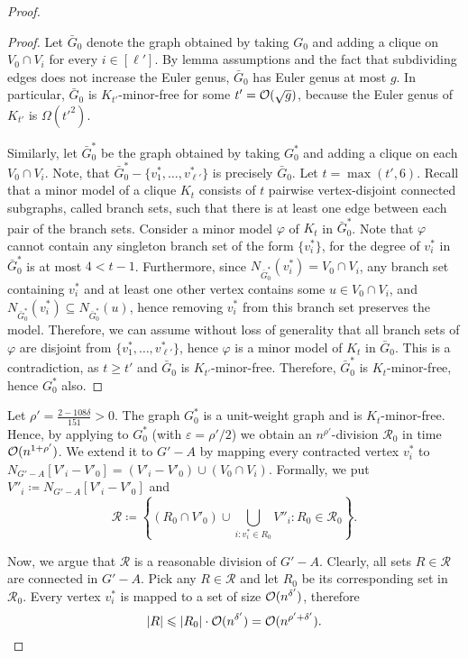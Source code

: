 \begin{proof}
\begin{proof}
Let $\bar{G}_0$ denote the graph obtained by taking $G_0$ and adding a clique on $V_0 \cap V_i$ for every $i \in [\ell']$.
By lemma assumptions and the fact that subdividing edges does not increase the Euler genus, $\bar{G}_0$ has Euler genus at most $g$. In particular, $\bar{G}_0$ is $K_{t'}$-minor-free for some $t' = \mathcal{O}(\sqrt{g})$, because the Euler genus of $K_{t'}$ is $\Omega({t'}^2)$.

Similarly, let $\bar{G}_0^*$ be the graph obtained by taking $G_0^*$ and adding a clique on each $V_0 \cap V_i$.
Note, that $\bar{G}_0^* - \{v_1^*, \dots, v_{\ell'}^*\}$ is precisely $\bar{G}_0$. Let $t = \max(t', 6)$.
Recall that a minor model of a clique $K_t$ consists of $t$ pairwise vertex-disjoint connected subgraphs, called
branch sets, such that there is at least one edge between each pair of the branch sets.
Consider a minor model $\varphi$ of $K_{t}$ in $\bar{G}^*_0$.
Note that $\varphi$ cannot contain any singleton branch set of the form $\{v^*_i\}$, for the degree of $v^*_i$ in $\bar{G}^*_0$ is at most $4 < t - 1$. Furthermore, since $N_{\bar{G}^*_0}(v^*_i) = V_0 \cap V_i$, any branch set containing $v^*_i$ and at least one other vertex contains some $u \in V_0 \cap V_i$, and $N_{\bar{G}^*_0}(v^*_i)\subseteq N_{\bar{G}^*_0}(u)$, hence removing $v^*_i$ from this branch set preserves the model. Therefore, we can assume without loss of generality that all branch sets of $\varphi$ are disjoint from $\{v^*_1, \dots, v^*_{\ell'}\}$, hence $\varphi$ is a minor model of $K_{t}$ in $\bar{G}_0$. This is a contradiction, as $t \geq t'$ and $\bar{G}_0$ is $K_{t'}$-minor-free. Therefore, $\bar{G}_0^*$ is $K_t$-minor-free, hence $G_0^*$ also.
\end{proof}

Let $\rho' = \frac{2 - 108 \delta}{151} > 0$. The graph $G^*_0$ is a unit-weight graph and is $K_{t}$-minor-free.
Hence, by applying  to $G^*_0$ (with $\varepsilon = \rho'/2$)
we obtain an $n^{\rho'}$-division $\mathcal{R}_0$ in time $\mathcal{O}(n^{1 + \rho'})$.
We extend it to $G' - A$ by mapping every contracted vertex $v^*_i$ to $N_{G' - A}[V'_i - V'_0] = (V'_i - V'_0) \cup (V_0 \cap V_i)$. Formally, we put $V''_i \coloneqq N_{G' - A}[V'_i - V'_0]$ and 
$$
\mathcal{R} \coloneqq \left\{ (R_0 \cap V'_0) \cup \bigcup_{i \colon v^*_i \in R_0} V''_i \colon R_0 \in \mathcal{R}_0 \right\}.
$$

Now, we argue that $\mathcal{R}$ is a reasonable division of $G' - A$. Clearly, all sets $R \in \mathcal{R}$ are connected in $G' - A$. Pick any $R \in \mathcal{R}$ and let $R_0$ be its corresponding set in $\mathcal{R}_0$.
Every vertex $v^*_i$ is mapped to a set of size $\mathcal{O}(n^{\delta'})$, therefore
$$|R| \leqslant |R_0| \cdot \mathcal{O}(n^{\delta'}) = \mathcal{O}(n^{\rho' + \delta'}).$$


\end{proof}
